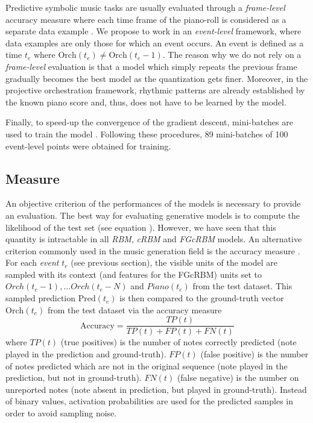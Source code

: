 \documentclass{article}
\begin{document}
Predictive symbolic music tasks are usually evaluated through a \textit{frame-level} accuracy measure where each time frame of the piano-roll is considered as a separate data example \cite{DBLP:journals/corr/YaoCVDD15,boulanger2012modeling,lavrenko2003polyphonic}.
We propose to work in an \textit{event-level} framework, where data examples are only those for which an event occurs. An event is defined as a time $t_{e}$ where $\text{Orch}(t_{e}) \neq \text{Orch}(t_{e} - 1)$. The reason why we do not rely on a \textit{frame-level} evaluation is that a model which simply repeats the previous frame gradually becomes the best model as the quantization gets finer. Moreover, in the projective orchestration framework, rhythmic patterns are already established by the known piano score and, thus, does not have to be learned by the model.

Finally, to speed-up the convergence of the gradient descent, mini-batches are used to train the model \cite{bishop2006pattern}. Following these procedures, 89 mini-batches of 100 event-level points were obtained for training.

\subsection{Measure}
An objective criterion of the performances of the models is necessary to provide an evaluation. 
The best way for evaluating generative models is to compute the likelihood of the test set (see equation ). However, we have seen that this quantity is intractable in all \textit{RBM}, \textit{cRBM} and \textit{FGcRBM} models. 
An alternative criterion commonly used in the music generation field is the accuracy measure \cite{DBLP:journals/corr/YaoCVDD15,boulanger2012modeling,lavrenko2003polyphonic}. For each \textit{event} $t_{e}$ (see previous section), the visible units of the model are sampled with its context (and features for the FGcRBM) units set to $Orch(t_{e}-1),... Orch(t_{e}-N)$ and $Piano(t_{e})$ from the test dataset. This sampled prediction $\text{Pred}(t_{e})$ is then compared to the ground-truth vector $\text{Orch}(t_{e})$ from the test dataset via the accuracy measure
\begin{equation}
\text{Accuracy}  = \frac{TP(t)}{TP(t) + FP(t) + FN(t)}
\label{eq:accuracy}
\end{equation}
where $TP(t)$ (true positives) is the number of notes correctly predicted (note played in the prediction and ground-truth). $FP(t)$ (false positive) is the number of notes predicted which are not in the original sequence (note played in the prediction, but not in ground-truth). $FN(t)$ (false negative) is the number on unreported notes (note absent in prediction, but played in ground-truth). 
Instead of binary values, activation probabilities are used for the predicted samples in order to avoid sampling noise.
\end{document}
